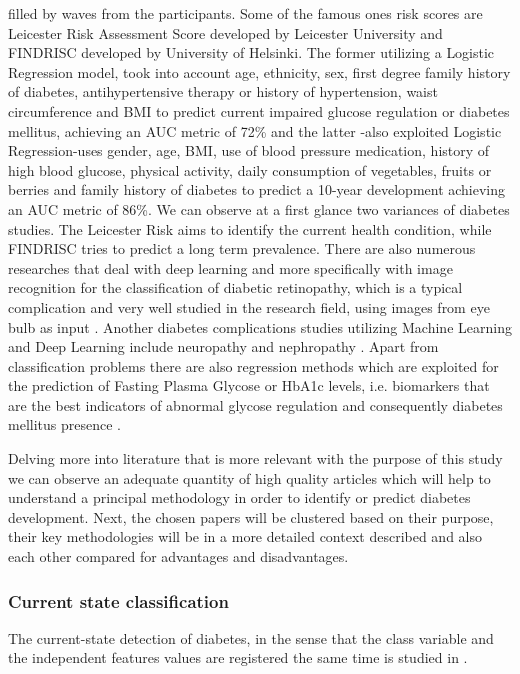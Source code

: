 \documentclass[journal,article,submit,pdftex,moreauthors]{Definitions/mdpi}
\begin{document}
filled by waves from the participants. Some of the famous ones risk scores
are Leicester Risk Assessment Score\cite{gray} developed by Leicester 
University and FINDRISC \cite{lindstrom} developed by University of 
Helsinki. The former utilizing a Logistic Regression model, took into account 
age, ethnicity, sex, first degree family history of diabetes, antihypertensive 
therapy or history of hypertension, waist circumference and BMI to predict 
current impaired glucose regulation or diabetes mellitus, achieving an AUC 
metric of 72\% and the latter -also exploited Logistic Regression-uses gender, 
age, BMI, use of blood pressure medication, history of high blood glucose, 
physical activity, daily  consumption of vegetables, fruits or berries and 
family history of diabetes to predict a 10-year development achieving an AUC 
metric of 86\%. We can observe at a first glance two variances of 
diabetes studies. The Leicester Risk aims to identify the current health condition, 
while FINDRISC tries to predict a long term prevalence.
There are also numerous researches that deal with deep learning
and  more specifically with image recognition for the classification of 
diabetic retinopathy, which is a typical complication and very well studied 
in the research field, using images from eye bulb as input 
\cite{Fregoso,KAVAKIOTIS2017104}. Another diabetes complications
studies utilizing Machine Learning and Deep Learning include neuropathy and nephropathy 
\cite{Fregoso,KAVAKIOTIS2017104}. Apart from classification 
problems there are also regression methods which are exploited 
for the prediction of Fasting Plasma Glycose or HbA1c levels, 
i.e. biomarkers that are the best indicators of abnormal 
glycose regulation and consequently diabetes  mellitus presence 
\cite{Fregoso,KAVAKIOTIS2017104,kopitar2020early}.
\par Delving more into literature that is more relevant with the purpose of this 
study we can observe an adequate quantity of high quality articles which will help
to understand a principal methodology in order to identify or predict diabetes 
development. Next, the chosen papers will be clustered based on their purpose, their key
methodologies will be in a more detailed context described and also each other compared
for advantages and disadvantages.

\subsubsection{Current state classification}
\par The current-state detection of diabetes, in the sense that the class variable and the
independent features values are registered the same time is studied in \cite{ Lai, Zou, Dinh, zhang,DeSilva,computation11050096,Qin, Rufo, Benita,  Dritsas}.
\end{document}
